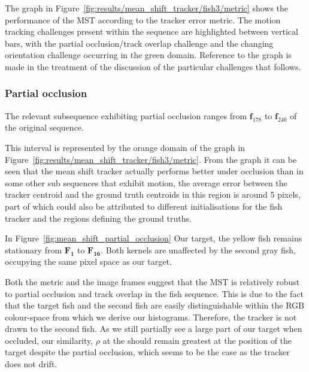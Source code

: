The graph in Figure~\ref{fig:results/mean_shift_tracker/fish3/metric} shows the
performance of the MST according to the tracker error metric.
The motion tracking challenges present within the sequence are highlighted
between vertical bars, with the partial occlusion/track overlap challenge and the changing orientation challenge occurring in the green domain.
Reference to the graph is made in the treatment of the discussion of the
particular challenges that follows.


\subsubsection{Partial occlusion}\label{mean_shift_partial_occlusion}
The relevant subsequence exhibiting partial occlusion ranges from
$\mathbf{f}_{178}$ to $\mathbf{f}_{240}$ of the original sequence. 

This interval is represented by the orange domain of the graph in
Figure~\ref{fig:results/mean_shift_tracker/fish3/metric}. From the graph it can be
seen that the mean shift tracker actually performs better under occlusion than in
some other sub sequences that exhibit motion, the average error between the
tracker centroid and the ground truth centroids in this region is around 5
pixels, part of which could also be attributed to different initialisations for
the fish tracker and the regions defining the ground truths.

In Figure~\ref{fig:mean_shift_partial_occlusion} Our target, the yellow fish
remains stationary from $\mathbf{F_{1}}$ to $\mathbf{F_{16}}$. Both kernels are
unaffected by the second gray fish, occupying the same pixel space as our
target. 

Both the metric and the image frames suggest that the MST is relatively robust
to partial occlusion and track overlap in the fish sequence. This is due to the fact that the target
fish and the second fish are easily distinguishable within the RGB colour-space
from which we derive our histograms. Therefore, the tracker is not drawn to the
second fish. As we still partially see a large part of our target when
occluded, our similarity, $\rho$ at the should remain greatest at the position
of the target despite the partial occlusion, which seems to be the case as the
tracker does not drift.

